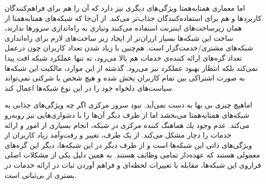 \documentclass[12pt,twoside]{xepersian-magazine}
\begin{document}
\begin{article}{1}
اما معماری همتابه‌همتا ويژگی‌های ديگری نيز دارد که آن را هم برای فراهم‌کنندگان کاربردها و هم برای استفاده‌کنندگان جذاب‌تر می‌کند.  از آن‌جا که شبکه‌های همتابه‌همتا از همان زيرساخت‌های اينترنت استفاده می‌کنند ونيازی به راه‌اندازی سرورها ندارند، ساخت اين شبكه‌ها بسيار ارزان‌تر از ايجاد زير ساخت‌های لازم برای راه‌اندازی شبكه‌های مشتری/خدمت‌گزار است.  هم‌چنين با زياد شدن تعداد کاربران چون درعمل تعداد گره‌های ارائه کننده‌ی خدمات هم بالا می‌رود، نه تنها عملكرد شبكه افت پيدا نمی‌كند بلكه انتظار بهبود عملکرد نيز می‌رود. گذشته از اين موارد، مالكيت اين شبكه‌ها به صورت اشتراكی بين تمام کاربران پخش شده و هيچ شخص يا شركتی نمی‌تواند سياست‌های دلخواه خود را در اين نوع شبكه‌ها اعمال کند.

اماهيچ چيزی بی‌ بها به دست نمی‌آید. نبود سرور مرکزی اگر چه  ويژگی‌های جذابی به شبکه‌های همتابه‌همتا می‌بخشد اما از طرف ديگر آن‌ها را با دشواری‌هايی نيز روبه‌رو می‌کند.  عدم وجود يك هماهنگ كننده مركزی در شبكه، انجام بسياری از امور و ارائه خدمات را  دچار مشكل می‌کند.  از يک طرف، تغيير و رفت‌وآمد زیاد کاربران از ويژگی‌های ذاتی اين شبکه‌ها است و از طرف ديگر در اين شبكه‌ها، ديگر اين گره‌های معمولی  هستند كه  عهده‌دار تمامی وظايف هستند. به همين دلیل يکی از مشکلات اصلی فراروی اين شبكه‌ها، مقابله با  تغييرات لحظه‌ای و فراهم آوردن ثبات در ارائه  خدمات در بستری از بی‌ثباتی است.  
\end{article}

\articlesep

\end{document}
